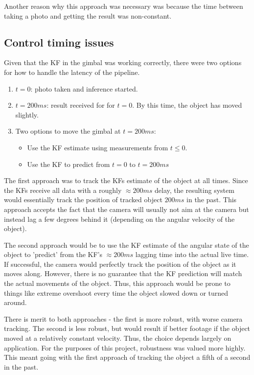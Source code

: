 Another reason why this approach was necessary was because the time between taking a photo and getting the result was non-constant.

\subsection{Control timing issues}
Given that the KF in the gimbal was working correctly, there were two options for how to handle the latency of the pipeline.

\begin{enumerate}
\item $t = 0$: photo taken and inference started.
\item $t = 200ms$: result received for for $t=0$. By this time, the object has moved slightly.
\item Two options to move the gimbal at $t=200ms$:
	\begin{itemize}
	\item Use the KF estimate using measurements from $t\le0$.
	\item Use the KF to predict from $t=0$ to $t=200ms$
	\end{itemize}
\end{enumerate}

The first approach was to track the KFs estimate of the object at all times. Since the KFs receive all data with a roughly $\approx 200ms$ delay, the resulting system would essentially track the position of tracked object $200ms$ in the past. This approach accepts the fact that the camera will usually not aim at the camera but instead lag a few degrees behind it (depending on the angular velocity of the object).

The second approach would be to use the KF estimate of the angular state of the object to 'predict' from the KF's $\approx 200ms$ lagging time into the actual live time. If successful, the camera would perfectly track the position of the object as it moves along. However, there is no guarantee that the KF prediction will match the actual movements of the object. Thus, this approach would be prone to things like extreme overshoot every time the object slowed down or turned around.

There is merit to both approaches - the first is more robust, with worse camera tracking. The second is less robust, but would result if better footage if the object moved at a relatively constant velocity. Thus, the choice depends largely on application. For the purposes of this project, robustness was valued more highly. This meant going with the first approach of tracking the object a fifth of a second in the past.



